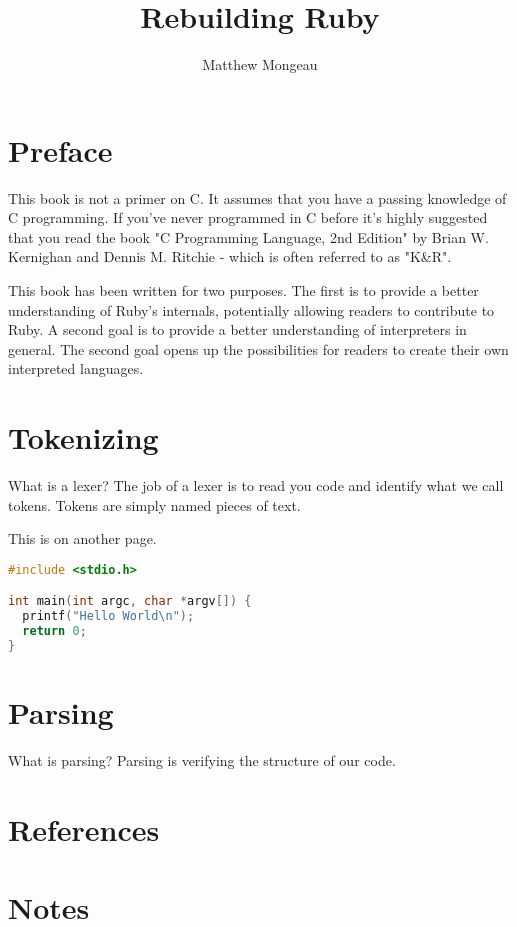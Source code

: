 \documentclass[oneside]{book}
\date{}
\begin{document}
\title{Rebuilding Ruby}
\author{Matthew Mongeau}
\maketitle

\frontmatter
\tableofcontents
\chapter*{Preface}

This book is not a primer on C. It assumes that you have a passing knowledge of C programming. If you've never programmed in C before it's highly suggested that you read the book "C Programming Language, 2nd Edition" by Brian W. Kernighan and Dennis M. Ritchie -  which is often referred to as "K\&R".

This book has been written for two purposes. The first is to provide a better understanding of Ruby's internals, potentially allowing readers to contribute to Ruby. A second goal is to provide a better understanding of interpreters in general. The second goal opens up the possibilities for readers to create their own interpreted languages.

\mainmatter
\chapter{Tokenizing}
What is a lexer? The job of a lexer is to read you code and identify what we call tokens. Tokens are simply named pieces of text.

\newpage
This is on another page.

\begin{lstlisting}[language=C]
#include <stdio.h>

int main(int argc, char *argv[]) {
  printf("Hello World\n");
  return 0;
}
\end{lstlisting}

\chapter{Parsing}
What is parsing? Parsing is verifying the structure of our code.

\appendix
\chapter{References}

\backmatter
\chapter{Notes}
\end{document}
